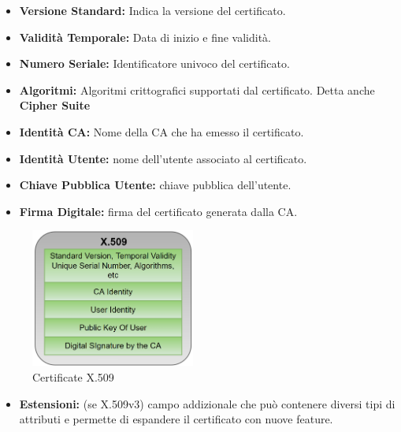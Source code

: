 \begin{example}
\begin{multicols}{2}
\begin{itemize}
    \item \textbf{Versione Standard:} Indica la versione del certificato.
    \item \textbf{Validità Temporale:} Data di inizio e fine validità.
    \item \textbf{Numero Seriale:} Identificatore univoco del certificato.
    \item \textbf{Algoritmi:} Algoritmi crittografici supportati dal certificato. Detta anche \textbf{Cipher Suite}
    \item \textbf{Identità CA:} Nome della CA che ha emesso il certificato.
    \item \textbf{Identità Utente:} nome dell'utente associato al certificato.
    \item \textbf{Chiave Pubblica Utente:} chiave pubblica dell'utente.
    \item \textbf{Firma Digitale:} firma del certificato generata dalla CA.
\end{itemize}
\columnbreak
\begin{figure}[H]
    \centering
    \includegraphics[width=0.48\textwidth]{image/x509.png}
    \caption{Certificate X.509}
    \label{fig:certx509}
    \vspace{-7pt}
\end{figure}
\begin{itemize}
    \item \textbf{Estensioni:} (se X.509v3) campo addizionale che può contenere diversi tipi di attributi e permette di espandere il certificato con nuove feature.
\end{itemize}
\end{multicols}
\end{example}
